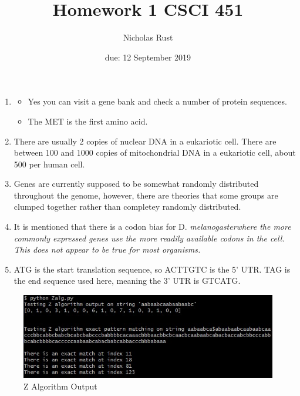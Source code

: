 \documentclass{article}
\title{Homework 1 CSCI 451}
\author{Nicholas Rust}
\date{due: 12 September 2019}
\begin{document}
\maketitle

\begin{enumerate}
	\item
	\begin{itemize}
		\item Yes you can visit a gene bank and check a number of protein sequences.
		\item The MET is the first amino acid.
	\end{itemize}
	\item There are usually 2 copies of nuclear DNA in a eukariotic cell. There are between 100 and 1000 copies of mitochondrial DNA in a eukariotic cell, about 500 per human cell.
	\item Genes are currently supposed to be somewhat randomly distributed throughout the genome, however, there are theories that some groups are clumped together rather than completey randomly distributed.
	\item It is mentioned that there is a codon bias for D. \em{melanogaster}\em where the more commonly expressed genes use the more readily available codons in the cell. This does not appear to be true for most organisms.
	\item ATG is the start translation sequence, so ACTTGTC is the 5' UTR. TAG is the end sequence used here, meaning the 3' UTR is GTCATG. 
\end{enumerate}

\begin{figure}
    \includegraphics[width=1.2\textwidth,center]{output.jpg}
    \caption{Z Algorithm Output}
\end{figure}
\end{document}
